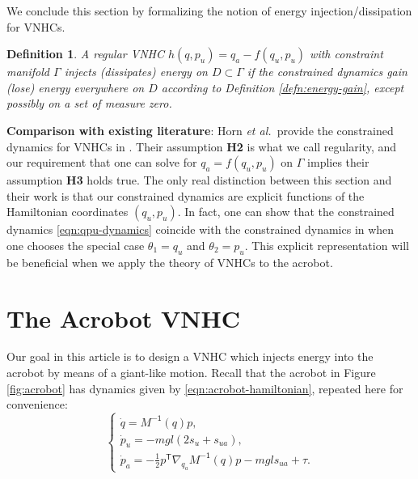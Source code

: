 \documentclass[journal,twoside,web, onecolumn, draftcls]{ieeecolor}
\newtheorem{defn}{Definition} %
\newcommand*{\tpose}{^\mathsf{T}}
\newcommand*{\Minv}{M^\mathsf{-1}}
\newcommand*{\etal}{\MakeLowercase{\textit{et al.~}}}
\begin{document}
We conclude this section by formalizing the notion of energy
injection/dissipation for VNHCs.

\begin{defn}\label{defn:energy-injection}
    A regular VNHC \(h(q,p_u) = q_a - f(q_u,p_u)\) with constraint manifold \(\Gamma\)
    \textit{injects (dissipates) energy on \(D \subset \Gamma\)} if the
    constrained dynamics gain (lose) energy everywhere on \(D\) according to
    Definition \ref{defn:energy-gain}, except possibly on a set of measure
    zero.
\end{defn}

\textbf{Comparison with existing literature}: Horn \etal provide the constrained
dynamics for VNHCs in \cite{nhvc_incline_walking}.
Their assumption \textbf{H2} is what we call regularity, and our requirement
that one can solve for \(q_a = f(q_u,p_u)\) on \(\Gamma\) implies their
assumption \textbf{H3} holds true.
The only real distinction between this section and their work is that
our constrained dynamics are explicit functions of the Hamiltonian coordinates
\((q_u,p_u)\).
In fact, one can show that the constrained dynamics \eqref{eqn:qpu-dynamics}
coincide with the constrained dynamics in
\cite[Eqn. (17)]{hybrid_zero_dynamics_bipedal_nhvcs}
when one chooses the special case \(\theta_1 = q_u\) and 
\(\theta_2 = p_u\).
This explicit representation will be beneficial when we apply the theory of
VNHCs to the acrobot.

\section{The Acrobot VNHC}\label{sec:acrobot}

Our goal in this article is to design a VNHC which injects energy into the
acrobot by means of a giant-like motion.
Recall that the acrobot in Figure \ref{fig:acrobot} has dynamics given by
\eqref{eqn:acrobot-hamiltonian}, repeated here for convenience:
    \begin{equation*}
     \begin{cases}
        \dot{q} = \Minv(q) p 
        ,\\
        \dot{p}_u = -mgl\left(2s_u + s_{ua}\right) 
        ,\\
        \dot{p}_a =-\frac{1}{2}p\tpose \nabla_{q_a}\Minv(q) p
        - mgl s_{ua} + \tau.
    \end{cases}
\end{equation*}
\end{document}
